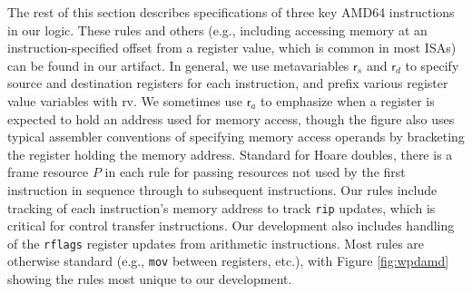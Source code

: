 The rest of this section describes specifications of three key \textsf{AMD64} instructions 
in our logic. 
These rules and others (e.g., including accessing memory at an instruction-specified offset from a register
value, which is common in most ISAs)
can be found in our artifact.
In general, we use metavariables $\textsf{r}_s$ and $\textsf{r}_d$ to specify source and destination registers
for each instruction, and prefix various register value variables with \textsf{rv}.
We sometimes use $\textsf{r}_a$ to emphasize when a register is expected to hold an address used
for memory access, though the figure also uses typical assembler conventions of specifying
memory access operands by bracketing the register holding the memory address.
Standard for Hoare doubles, there is a frame resource $P$ in each rule for passing resources
not used by the first instruction in sequence through to subsequent instructions.
Our rules include tracking of each instruction's memory address to track \lstinline|rip| updates, which is critical
for control transfer instructions. Our development also includes handling of the \lstinline|rflags| register updates from arithmetic instructions.
Most rules are otherwise standard (e.g., \lstinline|mov| between registers, etc.), with Figure \ref{fig:wpdamd} showing the rules
most unique to our development.


